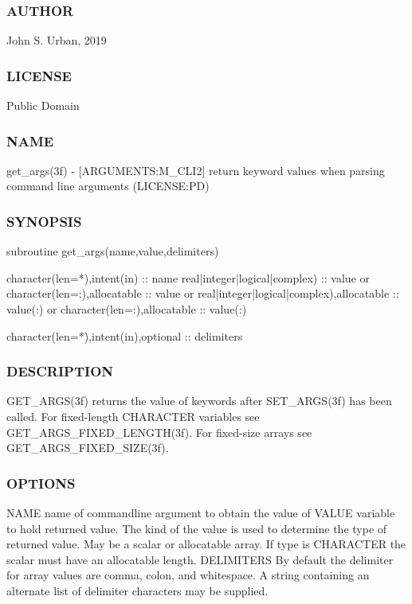  \subsubsection*{A\+U\+T\+H\+OR}

John S. Urban, 2019 \subsubsection*{L\+I\+C\+E\+N\+SE}

Public Domain \subsubsection*{N\+A\+ME}

get\+\_\+args(3f) -\/ \mbox{[}A\+R\+G\+U\+M\+E\+N\+TS\+:M\+\_\+\+C\+L\+I2\mbox{]} return keyword values when parsing command line arguments (L\+I\+C\+E\+N\+SE\+:PD)

\subsubsection*{S\+Y\+N\+O\+P\+S\+IS}

\begin{DoxyVerb} subroutine get_args(name,value,delimiters)

  character(len=*),intent(in) :: name
  real|integer|logical|complex) :: value
     or
  character(len=:),allocatable :: value
     or
  real|integer|logical|complex),allocatable :: value(:)
     or
  character(len=:),allocatable :: value(:)

  character(len=*),intent(in),optional :: delimiters
\end{DoxyVerb}


\subsubsection*{D\+E\+S\+C\+R\+I\+P\+T\+I\+ON}

\begin{DoxyVerb} GET_ARGS(3f) returns the value of keywords after SET_ARGS(3f)
 has been called. For fixed-length CHARACTER variables
 see GET_ARGS_FIXED_LENGTH(3f). For fixed-size arrays see
 GET_ARGS_FIXED_SIZE(3f).
\end{DoxyVerb}


\subsubsection*{O\+P\+T\+I\+O\+NS}

\begin{DoxyVerb} NAME        name of commandline argument to obtain the value of
 VALUE       variable to hold returned value. The kind of the value
             is used to determine the type of returned value. May
             be a scalar or allocatable array. If type is CHARACTER
             the scalar must have an allocatable length.
 DELIMITERS  By default the delimiter for array values are comma,
             colon, and whitespace. A string containing an alternate
             list of delimiter characters may be supplied.
\end{DoxyVerb}


